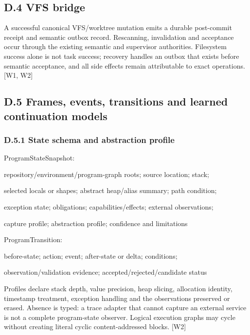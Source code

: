 \subsection*{D.4 VFS bridge}

A successful canonical VFS/worktree mutation emits a durable post-commit receipt and semantic
outbox record. Rescanning, invalidation and acceptance occur through the existing semantic and
supervisor authorities. Filesystem success alone is not task success; recovery handles an outbox that
exists before semantic acceptance, and all side effects remain attributable to exact operations. [W1,
W2]




\subsection*{D.5 Frames, events, transitions and learned continuation models}

\subsubsection*{D.5.1 State schema and abstraction profile}

\noindent ProgramStateSnapshot:\par
\noindent repository/environment/program-graph roots; source location; stack;\par
\noindent selected locals or shapes; abstract heap/alias summary; path condition;\par
\noindent exception state; obligations; capabilities/effects; external observations;\par
\noindent capture profile; abstraction profile; confidence and limitations\par
\noindent ProgramTransition:\par
\noindent before-state; action; event; after-state or delta; conditions;\par
\noindent observation/validation evidence; accepted/rejected/candidate status\par

Profiles declare stack depth, value precision, heap slicing, allocation identity, timestamp treatment,
exception handling and the observations preserved or erased. Absence is typed: a trace adapter that
cannot capture an external service is not a complete program-state observer. Logical execution graphs
may cycle without creating literal cyclic content-addressed blocks. [W2]

